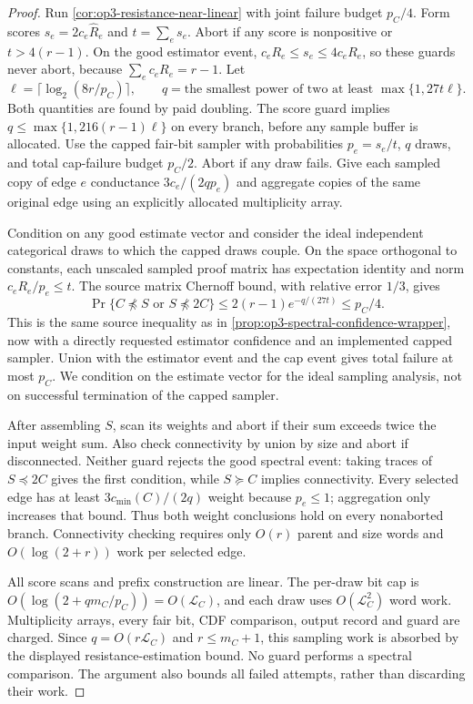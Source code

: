 \begin{proof}
Run \cref{cor:op3-resistance-near-linear} with joint failure budget
$p_C/4$. Form scores $s_e=2c_e\widehat R_e$ and $t=\sum_es_e$.
Abort if any score is nonpositive or $t>4(r-1)$. On the good estimator
event, $c_eR_e\leq s_e\leq4c_eR_e$, so these guards never abort,
because $\sum_e c_eR_e=r-1$.
Let
\[
 \ell=\lceil\log_2(8r/p_C)\rceil,
 \qquad q=\text{the smallest power of two at least }
               \max\{1,27t\ell\}.
\]
Both quantities are found by paid doubling. The score guard implies
$q\leq\max\{1,216(r-1)\ell\}$ on every branch, before any sample
buffer is allocated. Use the capped fair-bit sampler with probabilities
$p_e=s_e/t$, $q$ draws, and total cap-failure budget $p_C/2$.
Abort if any draw fails. Give each sampled copy of edge $e$ conductance
$3c_e/(2q p_e)$ and aggregate copies of the same original edge using
an explicitly allocated multiplicity array.

Condition on any good estimate vector and consider the ideal independent
categorical draws to which the capped draws couple. On the space
orthogonal to constants, each unscaled sampled proof matrix has expectation
identity and norm $c_eR_e/p_e\leq t$. The source matrix Chernoff bound,
with relative error $1/3$, gives
\[
 \Pr\{C\not\preceq S\text{ or }S\not\preceq2C\}
 \leq2(r-1)e^{-q/(27t)}\leq p_C/4.
\]
This is the same source inequality as in
\cref{prop:op3-spectral-confidence-wrapper}, now with a directly requested
estimator confidence and an implemented capped sampler. Union with the
estimator event and the cap event gives total failure at most $p_C$.
We condition on the estimate vector for the ideal sampling analysis,
not on successful termination of the capped sampler.

After assembling $S$, scan its weights and abort if their sum exceeds
twice the input weight sum. Also check connectivity by union by size
and abort if disconnected. Neither guard rejects the good spectral event:
taking traces of $S\preceq2C$ gives the first condition, while
$S\succeq C$ implies connectivity. Every selected edge has at least
$3c_{\min}(C)/(2q)$ weight because $p_e\leq1$; aggregation only
increases that bound. Thus both weight conclusions hold on every
nonaborted branch. Connectivity checking requires only $O(r)$ parent
and size words and $O(\log(2+r))$ work per selected edge.

All score scans and prefix construction are linear. The per-draw bit
cap is $O(\log(2+qm_C/p_C))=O(\mathcal L_C)$, and each draw uses
$O(\mathcal L_C^2)$ word work. Multiplicity arrays, every fair bit,
CDF comparison, output record and guard are charged. Since
$q=O(r\mathcal L_C)$ and $r\leq m_C+1$, this sampling work is
absorbed by the displayed resistance-estimation bound. No guard
performs a spectral comparison. The argument also bounds all failed
attempts, rather than discarding their work.
\end{proof}


